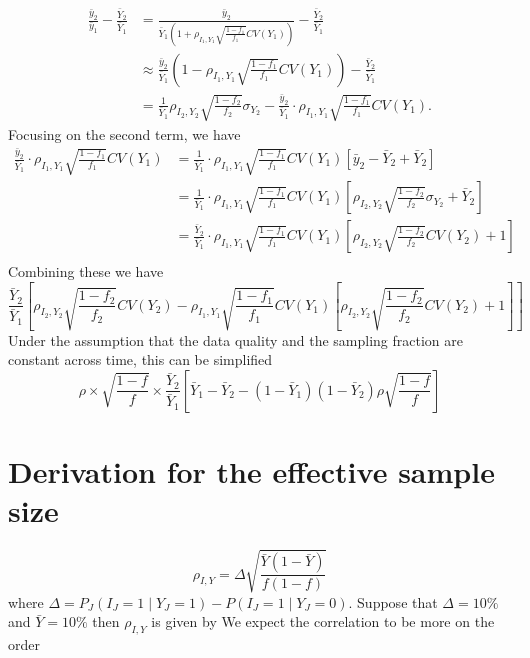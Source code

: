 \documentclass[11pt]{article}
\numberwithin{equation}{section}
\theoremstyle{plain}
\begin{document}
$$
\begin{aligned}
\frac{\bar y_2}{\bar y_1} - \frac{\bar Y_2}{\bar Y_1}
&= \frac{\bar y_2}{\bar Y_1  \left(1 + \rho_{I_1,Y_1} \sqrt{\frac{1-f_1}{f_1}} CV (Y_1) \right) } - \frac{\bar Y_2}{\bar Y_1}  \\
&\approx \frac{\bar y_2}{\bar Y_1} \left(1 - \rho_{I_1,Y_1} \sqrt{\frac{1-f_1}{f_1}} CV (Y_1) \right) - \frac{\bar Y_2}{\bar Y_1} \\
&= \frac{1}{\bar Y_1}  \rho_{I_2, Y_2} \sqrt{\frac{1-f_2}{f_2}} \sigma_{Y_2} - \frac{\bar y_2}{\bar Y_1} \cdot \rho_{I_1,Y_1} \sqrt{\frac{1-f_1}{f_1}} CV (Y_1).
\end{aligned}
$$
Focusing on the second term, we have
$$
\begin{aligned}
\frac{\bar y_2}{\bar Y_1} \cdot \rho_{I_1,Y_1} \sqrt{\frac{1-f_1}{f_1}} CV (Y_1) &= \frac{1}{\bar Y_1} \cdot \rho_{I_1,Y_1} \sqrt{\frac{1-f_1}{f_1}} CV (Y_1) \left[ \bar y_2 - \bar Y_2 + \bar Y_2 \right] \\
&= \frac{1}{\bar Y_1} \cdot \rho_{I_1,Y_1} \sqrt{\frac{1-f_1}{f_1}} CV (Y_1) \left[ \rho_{I_2, Y_2} \sqrt{\frac{1-f_2}{f_2}} \sigma_{Y_2} + \bar Y_2 \right] \\
&= \frac{\bar Y_2}{\bar Y_1} \cdot \rho_{I_1,Y_1} \sqrt{\frac{1-f_1}{f_1}} CV (Y_1) \left[ \rho_{I_2, Y_2} \sqrt{\frac{1-f_2}{f_2}} CV(Y_2) + 1 \right] \\
\end{aligned}
$$
Combining these we have
$$
\frac{\bar Y_2}{\bar Y_1} \left[ \rho_{I_2, Y_2} \sqrt{\frac{1-f_2}{f_2}} CV(Y_2)  - \rho_{I_1,Y_1} \sqrt{\frac{1-f_1}{f_1}} CV (Y_1) \left[ \rho_{I_2, Y_2} \sqrt{\frac{1-f_2}{f_2}} CV(Y_2) + 1 \right] \right]
$$
Under the assumption that the data quality and the sampling fraction are constant across time, this can be simplified
$$
\rho \times \sqrt{\frac{1-f}{f}} \times \frac{\bar Y_2}{\bar Y_1} \left[ \bar Y_1 - \bar Y_2 - (1-\bar Y_1)(1-\bar Y_2) \rho \sqrt{\frac{1-f}{f}} \right]
$$

\section{Derivation for the effective sample size}

\begin{equation} \label{eq:binaryrho}
\rho_{I,Y} = \Delta \sqrt{\frac{\bar Y (1 - \bar Y)}{f (1-f)} }
\end{equation}
where $\Delta = P_J (I_J = 1 \mid Y_J = 1) - P(I_J = 1 \mid Y_J = 0)$.  Suppose that $\Delta = 10\%$ and $\bar Y = 10\%$ then $\rho_{I,Y}$ is given by
We expect the correlation to be more on the order
\end{document}
